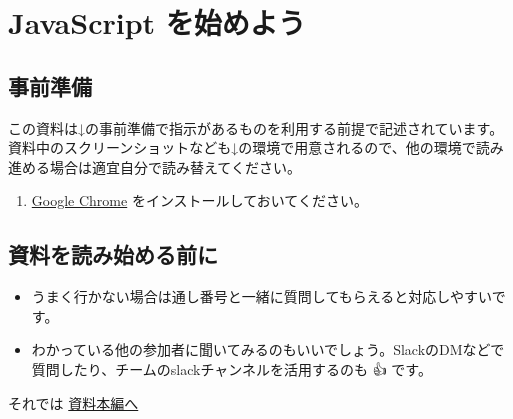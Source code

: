 \section{JavaScript
を始めよう}\label{javascript-ux3092ux59cbux3081ux3088ux3046}

\subsection{事前準備}\label{ux4e8bux524dux6e96ux5099}

この資料は↓の事前準備で指示があるものを利用する前提で記述されています。\\
資料中のスクリーンショットなども↓の環境で用意されるので、他の環境で読み進める場合は適宜自分で読み替えてください。

\begin{enumerate}
\def\labelenumi{\arabic{enumi}.}
\tightlist
\item
  \href{https://www.google.com/intl/ja/chrome/gsem/download/}{Google
  Chrome} をインストールしておいてください。
\end{enumerate}

\subsection{資料を読み始める前に}\label{ux8cc7ux6599ux3092ux8aadux307fux59cbux3081ux308bux524dux306b}

\begin{itemize}
\tightlist
\item
  うまく行かない場合は通し番号と一緒に質問してもらえると対応しやすいです。
\item
  わかっている他の参加者に聞いてみるのもいいでしょう。SlackのDMなどで質問したり、チームのslackチャンネルを活用するのも
  👍 です。
\end{itemize}

それでは \href{./DOCS.md}{資料本編へ}
